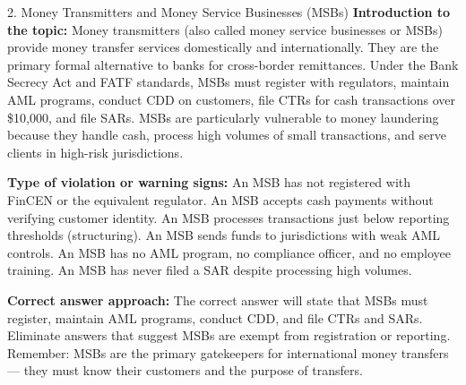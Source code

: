 \documentclass[11pt,a4paper]{beamer}
\begin{document}
\begin{frame}{2. Money Transmitters and Money Service Businesses (MSBs)}
\tiny
\noindent\textbf{Introduction to the topic:} Money transmitters (also called money service businesses or MSBs) provide money transfer services domestically and internationally. They are the primary formal alternative to banks for cross-border remittances. Under the Bank Secrecy Act and FATF standards, MSBs must register with regulators, maintain AML programs, conduct CDD on customers, file CTRs for cash transactions over \$10,000, and file SARs. MSBs are particularly vulnerable to money laundering because they handle cash, process high volumes of small transactions, and serve clients in high-risk jurisdictions.

\vspace{0.1cm}
\noindent\textbf{Type of violation or warning signs:} An MSB has not registered with FinCEN or the equivalent regulator. An MSB accepts cash payments without verifying customer identity. An MSB processes transactions just below reporting thresholds (structuring). An MSB sends funds to jurisdictions with weak AML controls. An MSB has no AML program, no compliance officer, and no employee training. An MSB has never filed a SAR despite processing high volumes.

\vspace{0.1cm}
\noindent\textbf{Correct answer approach:} The correct answer will state that MSBs must register, maintain AML programs, conduct CDD, and file CTRs and SARs. Eliminate answers that suggest MSBs are exempt from registration or reporting. Remember: MSBs are the primary gatekeepers for international money transfers — they must know their customers and the purpose of transfers.
\end{frame}
\end{document}
